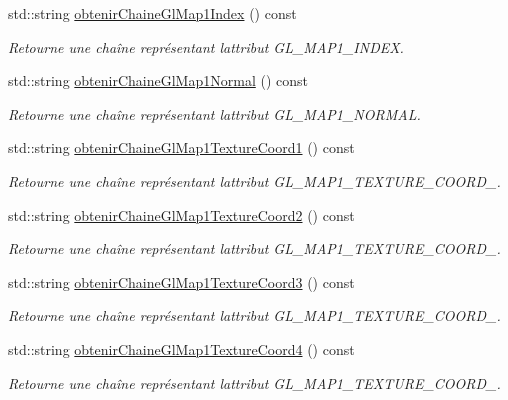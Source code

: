 \begin{DoxyCompactItemize}
std\+::string \hyperlink{group__utilitaire_ga52ba9a6fe299e4342d28baac6a83c769}{obtenir\+Chaine\+Gl\+Map1\+Index} () const 
\begin{DoxyCompactList}\small\item\em Retourne une chaîne représentant l\textquotesingle{}attribut G\+L\+\_\+\+M\+A\+P1\+\_\+\+I\+N\+D\+E\+X. \end{DoxyCompactList}\item 
std\+::string \hyperlink{group__utilitaire_gad0e75e07ddc5d51e11b4a9b525ee4190}{obtenir\+Chaine\+Gl\+Map1\+Normal} () const 
\begin{DoxyCompactList}\small\item\em Retourne une chaîne représentant l\textquotesingle{}attribut G\+L\+\_\+\+M\+A\+P1\+\_\+\+N\+O\+R\+M\+A\+L. \end{DoxyCompactList}\item 
std\+::string \hyperlink{group__utilitaire_gaf06cacbe0ee8f4fe4a6f56571fb8c27c}{obtenir\+Chaine\+Gl\+Map1\+Texture\+Coord1} () const 
\begin{DoxyCompactList}\small\item\em Retourne une chaîne représentant l\textquotesingle{}attribut G\+L\+\_\+\+M\+A\+P1\+\_\+\+T\+E\+X\+T\+U\+R\+E\+\_\+\+C\+O\+O\+R\+D\+\_. \end{DoxyCompactList}\item 
std\+::string \hyperlink{group__utilitaire_gade175aafd1123e597959f78fbe04489f}{obtenir\+Chaine\+Gl\+Map1\+Texture\+Coord2} () const 
\begin{DoxyCompactList}\small\item\em Retourne une chaîne représentant l\textquotesingle{}attribut G\+L\+\_\+\+M\+A\+P1\+\_\+\+T\+E\+X\+T\+U\+R\+E\+\_\+\+C\+O\+O\+R\+D\+\_. \end{DoxyCompactList}\item 
std\+::string \hyperlink{group__utilitaire_ga6690ab58fbdae84d2543e29cc9e4c41d}{obtenir\+Chaine\+Gl\+Map1\+Texture\+Coord3} () const 
\begin{DoxyCompactList}\small\item\em Retourne une chaîne représentant l\textquotesingle{}attribut G\+L\+\_\+\+M\+A\+P1\+\_\+\+T\+E\+X\+T\+U\+R\+E\+\_\+\+C\+O\+O\+R\+D\+\_. \end{DoxyCompactList}\item 
std\+::string \hyperlink{group__utilitaire_gab7a65aa462c3a278c42977ed9a35904e}{obtenir\+Chaine\+Gl\+Map1\+Texture\+Coord4} () const 
\begin{DoxyCompactList}\small\item\em Retourne une chaîne représentant l\textquotesingle{}attribut G\+L\+\_\+\+M\+A\+P1\+\_\+\+T\+E\+X\+T\+U\+R\+E\+\_\+\+C\+O\+O\+R\+D\+\_. \end{DoxyCompactList}\item 

\end{DoxyCompactItemize}
